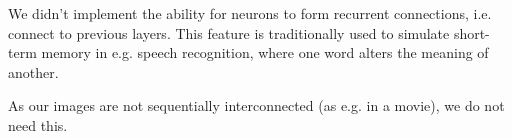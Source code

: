 We didn't implement the ability for neurons to form recurrent connections, i.e. connect to previous layers. This feature is traditionally used to simulate short-term memory in e.g. speech recognition, where one word alters the meaning of another. \cite{HasimSak2014}  

As our images are not sequentially interconnected (as e.g. in a movie), we do not need this.
